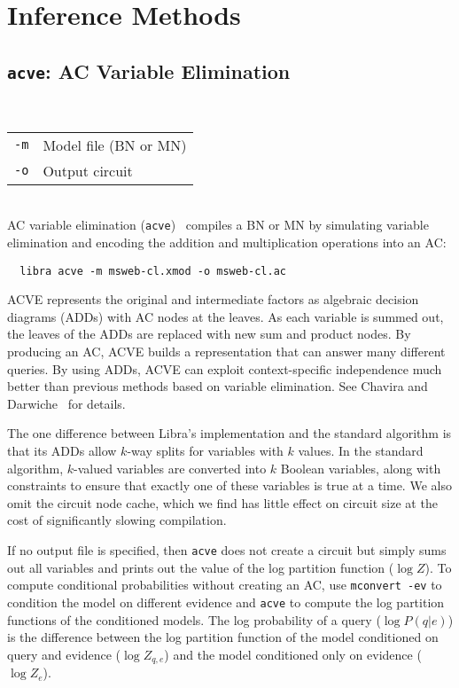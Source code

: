 \documentclass[11pt]{article}
\begin{document}
\section{Inference Methods}
\label{sec:inference}

\subsection{{\tt acve}: AC Variable Elimination} \label{sec:acve}

\noindent {} \\
\begin{tabular}{ll}
{\tt -m} &      Model file (BN or MN) \\
{\tt -o} &      Output circuit \\
\end{tabular} \\

AC variable elimination ({\tt acve})~\cite{chavira&darwiche07}
compiles a BN or MN by simulating variable elimination and encoding
the addition and multiplication operations into an AC:
\begin{verbatim}
  libra acve -m msweb-cl.xmod -o msweb-cl.ac
\end{verbatim}
ACVE represents the original and intermediate factors as algebraic
decision diagrams (ADDs) with AC nodes at the leaves.  As each
variable is summed out, the leaves of the ADDs are replaced with new
sum and product nodes.  By producing an AC, ACVE builds a
representation that can answer many different queries.  By using ADDs,
ACVE can exploit context-specific independence much better than
previous methods based on variable elimination.  See Chavira and
Darwiche~\cite{chavira&darwiche07} for details.

The one difference between Libra's implementation and the standard
algorithm is that its ADDs allow $k$-way splits for variables with $k$
values.  In the standard algorithm, $k$-valued variables are converted
into $k$ Boolean variables, along with constraints to ensure that
exactly one of these variables is true at a time.  We also omit the
circuit node cache, which we find has little effect on circuit size at
the cost of significantly slowing compilation.

If no output file is specified, then {\tt acve} does not create a
circuit but simply sums out all variables and prints out the value of
the log partition function ($\log Z$).  To compute conditional
probabilities without creating an AC, use {\tt mconvert -ev} to
condition the model on different evidence and {\tt acve} to compute
the log partition functions of the conditioned models.  The log
probability of a query ($\log P(q|e)$) is the difference between the
log partition function of the model conditioned on query and evidence
($\log Z_{q,e}$) and the model conditioned only on evidence ($\log
Z_{e}$).
\end{document}

